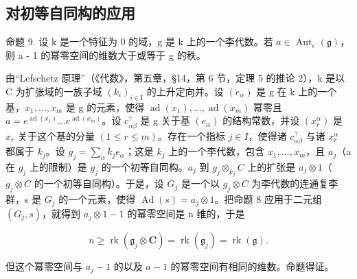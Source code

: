 \subsection{对初等自同构的应用}

命题 9. 设 k 是一个特征为 0 的域，g 是 k 上的一个李代数。若 \(a \in \operatorname{Aut}_{e}(\mathfrak{g})\)，则 a - 1 的幂零空间的维数大于或等于 g 的秩。

由“Lefschetz 原理”（《代数》，第五章，§14，第 6 节，定理 5 的推论 2），k 是以 C 为扩张域的一族子域 \((k_{i})_{i\in\mathrm{I}}\) 的上升定向并。设 \((e_{\alpha})\) 是 g 在 k 上的一个基，\(x_{1},\ldots,x_{m}\) 是 g 的元素，使得 \(\operatorname{ad}(x_{1}),\ldots,\operatorname{ad}(x_{m})\) 幂零且 \(a=e^{\operatorname{ad}(x_{1})}\ldots e^{\operatorname{ad}(x_{m})}\)。设 \(c_{\alpha\beta}^{\gamma}\) 是 g 关于基 \((e_{\alpha})\) 的结构常数，并设 \((x_{r}^{\alpha})\) 是 \(x_{r}\) 关于这个基的分量 \((1\leq r\leq m)\)。存在一个指标 \(j\in I\)，使得诸 \(c_{\alpha\beta}^{\gamma}\) 与诸 \(x_{r}^{\alpha}\) 都属于 \(k_{j}\)。设 \(g_{j}=\sum_{\alpha}k_{j}e_{\alpha}\)；这是 \(k_{j}\) 上的一个李代数，包含 \(x_{1},\ldots,x_{m}\)，且 \(a_{j}\)（a 在 \(g_{j}\) 上的限制）是 \(g_{j}\) 的一个初等自同构。\(a_{j}\) 到 \(g_{j}\otimes_{k_{j}}C\) 上的扩张是 \(a_{j}\otimes1\)（\(g_{j}\otimes C\) 的一个初等自同构）。于是，设 \(G_{j}\) 是一个以 \(g_{j}\otimes C\) 为李代数的连通复李群，s 是 \(G_{j}\) 的一个元素，使得 \(\operatorname{Ad}(s)=a_{j}\otimes1\)。把命题 8 应用于二元组 \((G_{j},s)\)，就得到 \(a_{j}\otimes1-1\) 的幂零空间是 n 维的，于是

\[
n \geq \operatorname{rk} (\mathfrak {g} _ {j} \otimes \mathbf {C}) = \operatorname{rk} (\mathfrak {g} _ {j}) = \operatorname{rk} (\mathfrak {g}).
\]

但这个幂零空间与 \(a_{j} - 1\) 的以及 \(a - 1\) 的幂零空间有相同的维数。命题得证。

